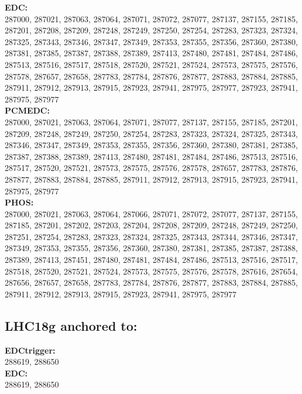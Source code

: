 	\textbf{EDC:}\\
	287000, 287021, 287063, 287064, 287071, 287072, 287077, 287137, 287155, 287185, 287201, 287208, 287209, 287248, 287249, 287250, 287254, 287283, 287323, 287324, 287325, 287343, 287346, 287347, 287349, 287353, 287355, 287356, 287360, 287380, 287381, 287385, 287387, 287388, 287389, 287413, 287480, 287481, 287484, 287486, 287513, 287516, 287517, 287518, 287520, 287521, 287524, 287573, 287575, 287576, 287578, 287657, 287658, 287783, 287784, 287876, 287877, 287883, 287884, 287885, 287911, 287912, 287913, 287915, 287923, 287941, 287975, 287977, 287923, 287941, 287975, 287977 \\

	\textbf{PCMEDC:}\\
	287000, 287021, 287063, 287064, 287071, 287077, 287137, 287155, 287185, 287201, 287209, 287248, 287249, 287250, 287254, 287283, 287323, 287324, 287325, 287343, 287346, 287347, 287349, 287353, 287355, 287356, 287360, 287380, 287381, 287385, 287387, 287388, 287389, 287413, 287480, 287481, 287484, 287486, 287513, 287516, 287517, 287520, 287521, 287573, 287575, 287576, 287578, 287657, 287783, 287876, 287877, 287883, 287884, 287885, 287911, 287912, 287913, 287915, 287923, 287941, 287975, 287977  \\

 \textbf{PHOS:}\\
287000, 287021, 287063, 287064, 287066, 287071, 287072, 287077, 287137, 287155, 287185, 287201, 287202, 287203, 287204, 287208, 287209, 287248, 287249, 287250, 287251, 287254, 287283, 287323, 287324, 287325, 287343, 287344, 287346, 287347, 287349, 287353, 287355, 287356, 287360, 287380, 287381, 287385, 287387, 287388, 287389, 287413, 287451, 287480, 287481, 287484, 287486, 287513, 287516, 287517, 287518, 287520, 287521, 287524, 287573, 287575, 287576, 287578, 287616, 287654, 287656, 287657, 287658, 287783, 287784, 287876, 287877, 287883, 287884, 287885, 287911, 287912, 287913, 287915, 287923, 287941, 287975, 287977\\

 \subsection{LHC18g anchored to:  }

 \textbf{EDCtrigger:}\\
 288619, 288650 \\

 \textbf{EDC:}\\
 288619, 288650 \\

